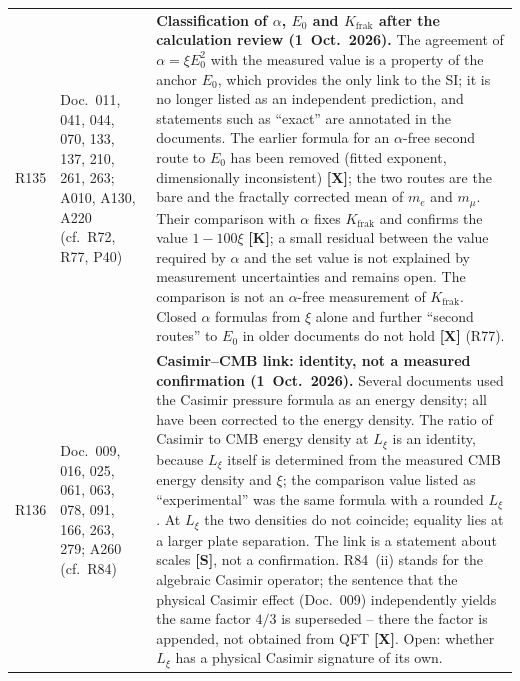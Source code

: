 \begin{longtable}{@{}p{0.9cm}p{3.1cm}p{10.2cm}@{}}
R135 & Doc.~011, 041, 044, 070, 133, 137, 210, 261, 263; A010, A130, A220 (cf.\ R72, R77, P40) & \textbf{Classification of $\alpha$, $E_0$ and $K_{\mathrm{frak}}$ after the calculation review (1~Oct.~2026).} The agreement of $\alpha = \xi E_0^2$ with the measured value is a property of the anchor $E_0$, which provides the only link to the SI; it is no longer listed as an independent prediction, and statements such as ``exact'' are annotated in the documents. The earlier formula for an $\alpha$-free second route to $E_0$ has been removed (fitted exponent, dimensionally inconsistent) \textbf{[X]}; the two routes are the bare and the fractally corrected mean of $m_e$ and $m_\mu$. Their comparison with $\alpha$ fixes $K_{\mathrm{frak}}$ and confirms the value $1-100\xi$ \textbf{[K]}; a small residual between the value required by $\alpha$ and the set value is not explained by measurement uncertainties and remains open. The comparison is not an $\alpha$-free measurement of $K_{\mathrm{frak}}$. Closed $\alpha$ formulas from $\xi$ alone and further ``second routes'' to $E_0$ in older documents do not hold \textbf{[X]} (R77). \\
R136 & Doc.~009, 016, 025, 061, 063, 078, 091, 166, 263, 279; A260 (cf.\ R84) & \textbf{Casimir--CMB link: identity, not a measured confirmation (1~Oct.~2026).} Several documents used the Casimir pressure formula as an energy density; all have been corrected to the energy density. The ratio of Casimir to CMB energy density at $L_\xi$ is an identity, because $L_\xi$ itself is determined from the measured CMB energy density and $\xi$; the comparison value listed as ``experimental'' was the same formula with a rounded $L_\xi$. At $L_\xi$ the two densities do not coincide; equality lies at a larger plate separation. The link is a statement about scales \textbf{[S]}, not a confirmation. R84~(ii) stands for the algebraic Casimir operator; the sentence that the physical Casimir effect (Doc.~009) independently yields the same factor $4/3$ is superseded -- there the factor is appended, not obtained from QFT \textbf{[X]}. Open: whether $L_\xi$ has a physical Casimir signature of its own. \\

\end{longtable}
